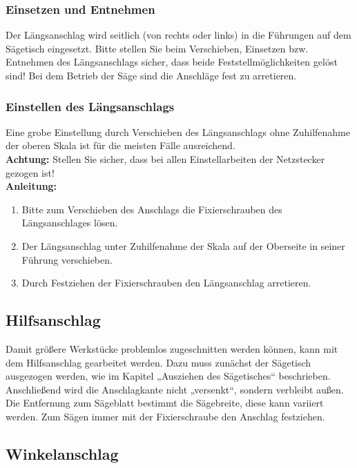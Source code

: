 \documentclass{\basedir/fablab-document}
\begin{document}
\subsubsection{Einsetzen und Entnehmen}
Der Längsanschlag wird seitlich (von rechts oder links) in die Führungen auf dem Sägetisch eingesetzt. Bitte stellen Sie beim Verschieben, Einsetzen bzw. Entnehmen des Längsanschlags sicher, dass beide Feststellmöglichkeiten gelöst sind! Bei dem Betrieb der Säge sind die Anschläge fest zu arretieren. 

\subsubsection{Einstellen des Längsanschlags}

Eine grobe Einstellung durch Verschieben des Längsanschlags ohne Zuhilfenahme der oberen Skala ist für die meisten Fälle ausreichend.\\
\textbf{Achtung:} Stellen Sie sicher, dass bei allen Einstellarbeiten der Netzstecker gezogen ist! \\

\textbf{Anleitung:} \\
\renewcommand{\labelenumi}{\alph{enumi})}
\begin{enumerate}
	\item Bitte zum Verschieben des Anschlags die Fixierschrauben des Längsanschlages lösen.
	\item Der Längsanschlag unter Zuhilfenahme der Skala auf der Oberseite in seiner Führung verschieben. 
	\item Durch Festziehen der Fixierschrauben den Längsanschlag arretieren.
	
\end{enumerate}

\subsection{Hilfsanschlag}
Damit größere Werkstücke problemlos zugeschnitten werden können, kann mit dem Hilfsanschlag gearbeitet werden. Dazu muss zunächst der Sägetisch ausgezogen werden, wie im Kapitel „Ausziehen des Sägetisches“ beschrieben. Anschließend wird die Anschlagkante nicht „versenkt“, sondern verbleibt außen. \\
Die Entfernung zum Sägeblatt bestimmt die Sägebreite, diese kann variiert werden. Zum Sägen immer mit der Fixierschraube den Anschlag festziehen.
\subsection{Winkelanschlag}
\end{document}
